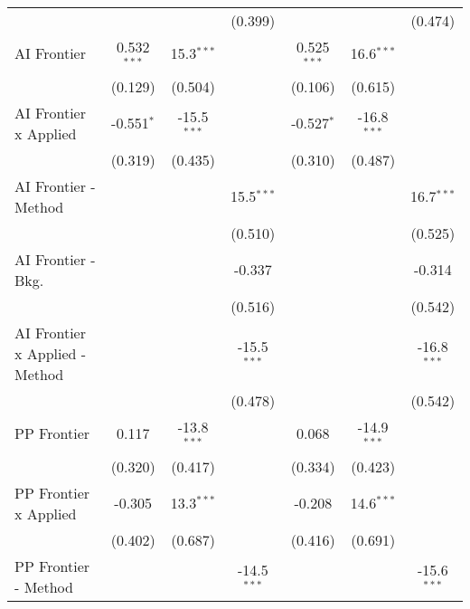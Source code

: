 \begin{tabular}{lcccccc}
                                  &                &                & (0.399)       &                &                & (0.474)\\   
   AI Frontier                    & 0.532$^{***}$  & 15.3$^{***}$   &               & 0.525$^{***}$  & 16.6$^{***}$   &   \\   
                                  & (0.129)        & (0.504)        &               & (0.106)        & (0.615)        &   \\   
   AI Frontier x Applied          & -0.551$^{*}$   & -15.5$^{***}$  &               & -0.527$^{*}$   & -16.8$^{***}$  &   \\   
                                  & (0.319)        & (0.435)        &               & (0.310)        & (0.487)        &   \\   
   AI Frontier - Method           &                &                & 15.5$^{***}$  &                &                & 16.7$^{***}$\\   
                                  &                &                & (0.510)       &                &                & (0.525)\\   
   AI Frontier - Bkg.             &                &                & -0.337        &                &                & -0.314\\   
                                  &                &                & (0.516)       &                &                & (0.542)\\   
   AI Frontier x Applied - Method &                &                & -15.5$^{***}$ &                &                & -16.8$^{***}$\\   
                                  &                &                & (0.478)       &                &                & (0.542)\\   
   PP Frontier                    & 0.117          & -13.8$^{***}$  &               & 0.068          & -14.9$^{***}$  &   \\   
                                  & (0.320)        & (0.417)        &               & (0.334)        & (0.423)        &   \\   
   PP Frontier x Applied          & -0.305         & 13.3$^{***}$   &               & -0.208         & 14.6$^{***}$   &   \\   
                                  & (0.402)        & (0.687)        &               & (0.416)        & (0.691)        &   \\   
   PP Frontier - Method           &                &                & -14.5$^{***}$ &                &                & -15.6$^{***}$\\   

\end{tabular}
